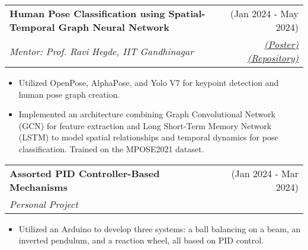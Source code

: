 \documentclass[a4paper,10pt]{report}
\makeatletter
\newcommand{\resumeSubheading}[4]{
  \vspace{-1pt}\item
    \begin{tabular*}{0.97\textwidth}[t]{l@{\extracolsep{\fill}}r}
      \textbf{#1} & #2 \\
      \textit{\small#3} & \textit{\small #4} \\
    \end{tabular*}\vspace{-6pt}
}
\makeatother
\begin{document}
\vspace{-6pt}

    \resumeSubheading
      {Human Pose Classification using Spatial-Temporal Graph Neural Network}{(Jan 2024 - May 2024)}{Mentor: Prof. Ravi Hegde, IIT Gandhinagar}
      {\textcolor{lightblue}{\href{https://drive.google.com/file/d/1eB51xk6ZKn7HR4SFfv9kwp1dmNQnQqGG/view?usp=sharing}{(Poster)}}\textcolor{lightblue}{\href{https://github.com/Utkarsh-Mishra444/Human-Pose-GNN}{(Repository)}}}{}
       \begin{itemize}
        \item Utilized OpenPose, AlphaPose, and Yolo V7 for keypoint detection and human pose graph creation.
        \vspace{-2pt}
        \item Implemented an architecture combining Graph Convolutional Network (GCN) for feature extraction and Long Short-Term Memory Network (LSTM) to model spatial relationships and temporal dynamics for pose classification. Trained on the MPOSE2021 dataset.

     \end{itemize}

\vspace{-6pt}

    \resumeSubheading
      {Assorted PID Controller-Based Mechanisms}{(Jan 2024 - Mar 2024)}{Personal Project}
      {}{}
       \begin{itemize}
        \item Utilized an Arduino to develop three systems: a ball balancing on a beam, an inverted pendulum, and a reaction wheel, all based on PID control.
        \vspace{-2pt}

     \end{itemize}


\vspace{-6pt}
\end{document}
